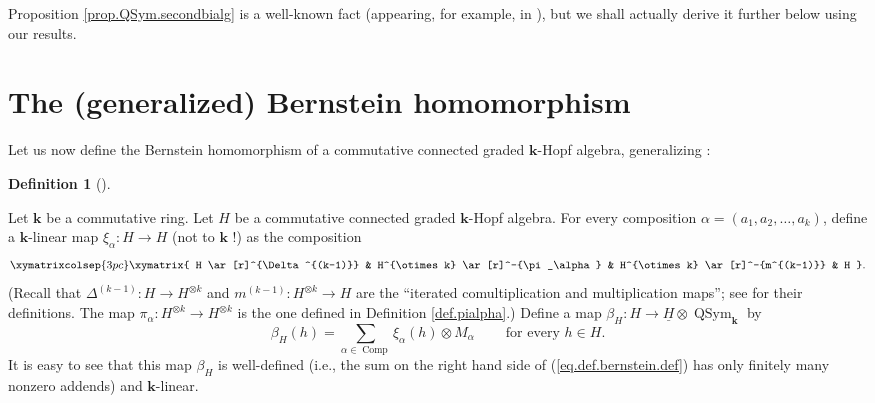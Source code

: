 \documentclass[numbers=enddot,12pt,final,onecolumn,notitlepage,abstracton]{scrartcl}%
\theoremstyle{definition}
\newtheorem{defi}[theo]{Definition}
\newenvironment{definition}[1][]
{\begin{defi}[#1]\begin{leftbar}}
{\end{leftbar}\end{defi}}
\let\sumnonlimits\sum
\renewcommand{\sum}{\sumnonlimits\limits}
\begin{document}
Proposition \ref{prop.QSym.secondbialg} is a well-known fact (appearing, for
example, in \cite[first paragraph of \S 3]{MalReu95}), but we shall actually
derive it further below using our results.

\section{The (generalized) Bernstein homomorphism}

Let us now define the Bernstein homomorphism of a commutative connected graded
$\mathbf{k}$-Hopf algebra, generalizing \cite[\S 18.24]{HazeWitt}:

\begin{definition}
\label{def.bernstein}Let $\mathbf{k}$ be a commutative ring. Let $H$ be a
commutative connected graded $\mathbf{k}$-Hopf algebra. For every composition
$\alpha=\left(  a_{1},a_{2},\ldots,a_{k}\right)  $, define a $\mathbf{k}%
$-linear map $\xi_{\alpha}:H\rightarrow H$ (not to $\mathbf{k}$ !) as the
composition%
\[%
\xymatrixcolsep{3pc}
\xymatrix{
H \ar[r]^{\Delta^{(k-1)}} & H^{\otimes k} \ar[r]^-{\pi_\alpha} & H^{\otimes k}
\ar[r]^-{m^{(k-1)}} & H
}%
.
\]
(Recall that $\Delta^{\left(  k-1\right)  }:H\rightarrow H^{\otimes k}$ and
$m^{\left(  k-1\right)  }:H^{\otimes k}\rightarrow H$ are the
\textquotedblleft iterated comultiplication and multiplication
maps\textquotedblright; see \cite[\S 1.4]{Reiner} for their definitions. The
map $\pi_{\alpha}:H^{\otimes k}\rightarrow H^{\otimes k}$ is the one defined
in Definition \ref{def.pialpha}.) Define a map $\beta_{H}:H\rightarrow
\underline{H}\otimes\operatorname*{QSym}\nolimits_{\mathbf{k}}$ by%
\begin{equation}
\beta_{H}\left(  h\right)  =\sum_{\alpha\in\operatorname*{Comp}}\xi_{\alpha
}\left(  h\right)  \otimes M_{\alpha}\ \ \ \ \ \ \ \ \ \ \text{for every }h\in
H. \label{eq.def.bernstein.def}%
\end{equation}
It is easy to see that this map $\beta_{H}$ is well-defined (i.e., the sum on
the right hand side of (\ref{eq.def.bernstein.def}) has only finitely many
nonzero addends\footnotemark) and $\mathbf{k}$-linear.
\end{definition}
\end{document}
